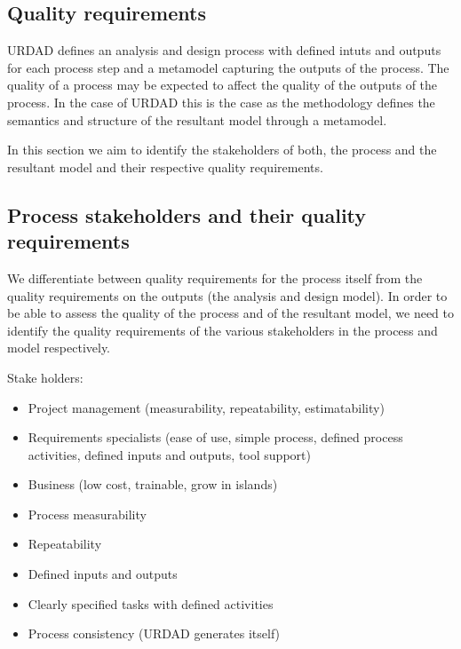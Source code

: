\subsection{Quality requirements}

URDAD defines an analysis and design process with defined intuts and outputs for each process step and a metamodel capturing the outputs of the process. The quality of a process may be expected to affect the quality of the outputs of the process. In the case of URDAD this is the case as the methodology defines the semantics and structure of the resultant model through a metamodel.

In this section we aim to identify the stakeholders of both, the process and the resultant model and their respective quality requirements.


\subsection{Process stakeholders and their quality requirements}


We differentiate between quality requirements for the process itself from the quality requirements on the outputs (the analysis and design model). In order to be able to assess the quality of the process and of the resultant model, we need to identify the quality requirements of the various stakeholders in the process and model respectively.


\cite{berard_what_1995}

Stake holders:
\begin{itemize}
  \item Project management (measurability, repeatability, estimatability)
  \item Requirements specialists (ease of use, simple process, defined process activities, defined inputs and outputs, tool support)
  \item Business (low cost, trainable, grow in islands)
\end{itemize}


\begin{itemize}
  \item Process measurability
  \item Repeatability
  \item Defined inputs and outputs
  \item Clearly specified tasks with defined activities
  \item Process consistency (URDAD generates itself)
\end{itemize}

